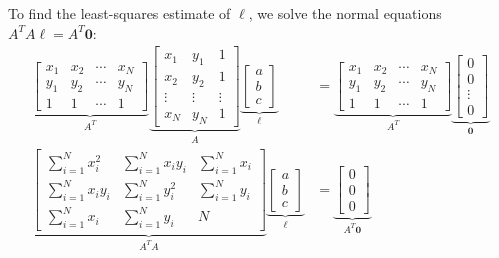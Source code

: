 \begin{problem}
\begin{enumroman}
\begin{answer}
        To find the least-squares estimate of $\ell$, we solve the
        normal equations $A^T A \ell = A^T \mathbf{0}$:
        \begin{align*}
          \underbrace{\begin{bmatrix}
            x_1 & x_2 & \cdots & x_N \\
            y_1 & y_2 & \cdots & y_N \\
            1 & 1 & \cdots & 1
          \end{bmatrix}}_{A^T}
          \underbrace{\begin{bmatrix}
            x_1 & y_1 & 1 \\
            x_2 & y_2 & 1 \\
            \vdots & \vdots & \vdots \\
            x_N & y_N & 1
          \end{bmatrix}}_{A}
          \underbrace{\begin{bmatrix}
            a \\
            b \\
            c
          \end{bmatrix}}_{\ell}
          &=
          \underbrace{\begin{bmatrix}
            x_1 & x_2 & \cdots & x_N \\
            y_1 & y_2 & \cdots & y_N \\
            1 & 1 & \cdots & 1
          \end{bmatrix}}_{A^T}
          \underbrace{\begin{bmatrix}
            0 \\
            0 \\
            \vdots \\
            0
          \end{bmatrix}}_{\mathbf{0}} \\
          \underbrace{\begin{bmatrix}
            \sum\limits_{i=1}^N x_i^2 & \sum\limits_{i=1}^N x_i y_i & \sum\limits_{i=1}^N x_i \\
            \sum\limits_{i=1}^N x_i y_i & \sum\limits_{i=1}^N y_i^2 & \sum\limits_{i=1}^N y_i \\
            \sum\limits_{i=1}^N x_i & \sum\limits_{i=1}^N y_i & N
          \end{bmatrix}}_{A^T A}
          \underbrace{\begin{bmatrix}
            a \\
            b \\
            c
          \end{bmatrix}}_{\ell}
          &=
          \underbrace{\begin{bmatrix}
            0 \\
            0 \\
            0
          \end{bmatrix}}_{A^T \mathbf{0}}
        \end{align*}


\end{answer}
\end{enumroman}
\end{problem}
